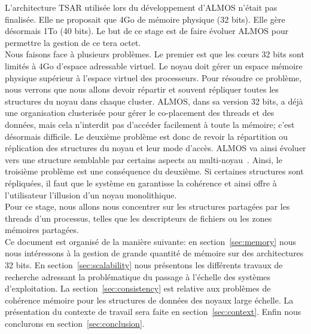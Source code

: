  L'architecture TSAR utilisée lors du développement d'ALMOS n'était pas
  finalisée. Elle ne proposait que 4Go de mémoire physique (32 bits). Elle gère
  désormais 1To (40 bits). Le but de ce stage est de faire évoluer ALMOS pour
  permettre la gestion de ce tera octet.\\

  Nous faisons face à plusieurs problèmes. Le premier est que les c\oe urs 32
  bits sont limités à 4Go d'espace adressable virtuel. Le noyau doit gérer un
  espace mémoire physique supérieur à l'espace virtuel des processeurs. Pour
  résoudre ce problème, nous verrons que nous allons devoir répartir et souvent
  répliquer toutes les structures du noyau dans chaque cluster. ALMOS, dans sa
  version 32 bits, a déjà une organisation clusterisée pour gérer le
  co-placement des threads et des données, mais cela n'interdit pas d'accéder
  facilement à toute la mémoire; c'est désormais difficile. Le deuxième problème
  est donc de revoir la répartition ou réplication des structures du noyau et
  leur mode d'accès. ALMOS va ainsi évoluer vers une structure semblable par
  certains aspects au multi-noyau~\citep{baumann2009multikernel}. Ainsi, le
  troisième problème est une conséquence du deuxième. Si certaines structures
  sont répliquées, il faut que le système en garantisse la cohérence et ainsi
  offre à l'utilisateur l'illusion d'un noyau monolithique. \\

  Pour ce stage, nous allons nous concentrer sur les structures partagées par
  les threads d'un processus, telles que les descripteurs de fichiers ou les
  zones mémoires partagées. \\

  Ce document est organisé de la manière suivante: en section~\ref{sec:memory}
  nous nous intéressons à la gestion de grande quantité de mémoire sur des
  architectures 32 bits. En section~\ref{sec:scalability} nous présentons les
  différents travaux de recherche adressant la problématique du passage à
  l'échelle des systèmes d'exploitation.  La section~\ref{sec:consistency} est
  relative aux problèmes de cohérence mémoire pour les structures de données des
  noyaux large échelle. La présentation du contexte de travail sera faite en
  section~\ref{sec:context}. Enfin nous conclurons en
  section~\ref{sec:conclusion}.\newline
